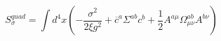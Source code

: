 \begin{equation}
S_{\sigma }^{quad}=\int d^{4}x\left( -\frac{\sigma ^{2}}{2\xi g^{2}}+%
\overline{c}^{a}\Sigma ^{ab}c^{b}+\frac{1}{2}A^{a\mu }\Omega _{\mu \nu
}^{ab}A^{b\nu }\right)   \label{sseff}
\end{equation}

